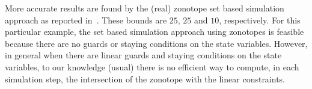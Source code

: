 More accurate results are found by the (real) zonotope set based
simulation approach as reported in~\cite{TODO}.  These bounds are
$25$, $25$ and $10$, respectively.  For this particular example, the
set based simulation approach using zonotopes is feasible because
there are no guards or staying conditions on the state variables.
However, in general when there are linear guards and staying
conditions on the state variables, to our knowledge (usual) there is
no efficient way to compute, in each simulation step, the intersection
of the zonotope with the linear constraints.


